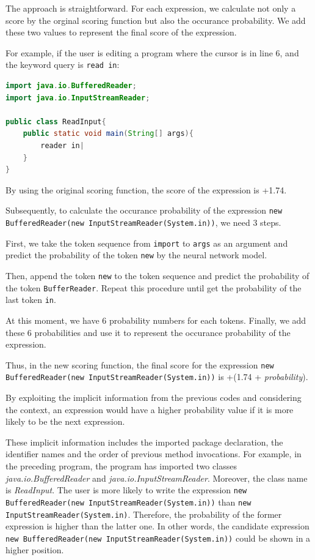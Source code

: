 \documentclass[PRO,english]{ipsj}
\begin{document}
The approach is straightforward. For each expression, we calculate not only a score by the orginal scoring function but also the occurance probability. We add these two values to represent the final score of the expression.

For example, if the user is editing a program where the cursor is in line 6, and the keyword query is \texttt{read in}:
\begin{lstlisting}[language=Java]
import java.io.BufferedReader;
import java.io.InputStreamReader;

public class ReadInput{
    public static void main(String[] args){
        reader in|
    }
}
\end{lstlisting}

By using the original scoring function, the score of the expression is +1.74. 

Subsequently, to calculate the occurance probability of the expression \texttt{new BufferedReader(new InputStreamReader(System.in))}, we need 3 steps. 

First, we take the token sequence from \texttt{import} to \texttt{args} as an argument and predict the probability of the token \texttt{new} by the neural network model. 

Then, append the token \texttt{new} to the token sequence and predict the probability of the token \texttt{BufferReader}. Repeat this procedure until get the probability of the last token \texttt{in}. 

At this moment, we have 6 probability numbers for each tokens.  Finally, we add these 6 probabilities and use it to represent the occurance probability of the expression.

Thus, in the new scoring function, the final score for the expression \texttt{new BufferedReader(new InputStreamReader(System.in))} is +(1.74 + \textit{probability}).

By exploiting the implicit information from the previous codes and considering the context, an expression would have a higher probability value if it is more likely to be the next expression. 

These implicit information includes the imported package declaration, the identifier names and the order of previous method invocations. For example, in the preceding program, the program has imported two classes \textit{java.io.BufferedReader} and \textit{java.io.InputStreamReader}. Moreover, the class name is \textit{ReadInput}. The user is more likely to write the expression \texttt{new BufferedReader(new InputStreamReader(System.in))} than \texttt{new InputStreamReader(System.in)}. Therefore, the probability of the former expression is higher than the latter one. In other words, the candidate expression \texttt{new BufferedReader(new InputStreamReader(System.in))} could be shown in a higher position.
\end{document}
